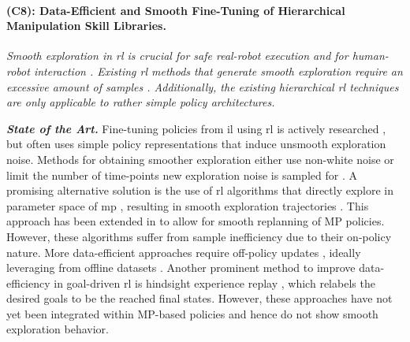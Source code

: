 \documentclass{erc-B2}
\begin{document}
% 
\paragraph{(C8): Data-Efficient and Smooth Fine-Tuning of Hierarchical Manipulation Skill Libraries.} 

\textit{Smooth exploration in \gls*{rl} is crucial for safe real-robot execution and for human-robot interaction \cite{Losey2019}. Existing \gls*{rl} methods that generate smooth exploration require an excessive amount of samples \cite{raffin2021smooth, chiappa2023latent}. Additionally, the existing hierarchical \gls*{rl} techniques are only applicable to rather simple policy architectures.}

\textit{\textbf{State of the Art.}} 
Fine-tuning policies from \gls*{il} using \gls*{rl} is actively researched \cite{Zhu-RSS-18,pmlr-v155-julian21a,Rajeswaran2018Dexterous, ball2023efficient}, but often uses simple policy representations that induce unsmooth exploration noise. Methods for obtaining smoother exploration either use non-white noise \cite{eberhard2023pink} or limit the number of time-points new exploration noise is sampled for \cite{raffin2021smooth}. 
A promising alternative solution is the use of \gls*{rl} algorithms that directly explore in parameter space of \gls*{mp} \cite{paraschos2013probabilistic,li2023prodmp}, resulting in smooth exploration trajectories \cite{li2023tcp,otto2023deep}. This approach has been extended in \cite{otto2023mp3} to allow for smooth replanning of MP policies. However, these algorithms suffer from sample inefficiency due to their on-policy nature.
More data-efficient approaches require off-policy updates \cite{lillicrap2015continuous, haarnoja2018soft, fujimoto2018addressing}, ideally leveraging from offline datasets \cite{kumar2020conservative,kostrikov2021offline,ball2023efficient}. Another prominent method to improve data-efficiency in goal-driven \gls*{rl} is hindsight experience replay \cite{NIPS2017_453fadbd}, which relabels the desired goals to be the reached final states. 
However, these approaches have not yet been integrated within MP-based policies and hence do not show smooth exploration behavior.
\end{document}
